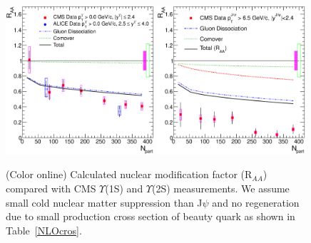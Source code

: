 \documentclass[aps,prc,preprint,superscriptaddress,showpacs,showkeys]{revtex4-1}
\begin{document}
\begin{figure}
\includegraphics[width=0.49\textwidth]{CMS_RAA_Upsilon1S.eps}
\includegraphics[width=0.49\textwidth]{CMS_RAA_Upsilon2S.eps}
\caption{(Color online) Calculated nuclear modification factor (R$_{AA}$) compared with CMS $\Upsilon$(1S) and $\Upsilon$(2S) measurements.
We assume small cold nuclear matter suppression than J$\psi$ and no regeneration due to small production cross section of beauty quark as shown in Table~\ref{NLOcros}.}
\label{fig:UpsilonRaa}
\end{figure}

\end{document}
